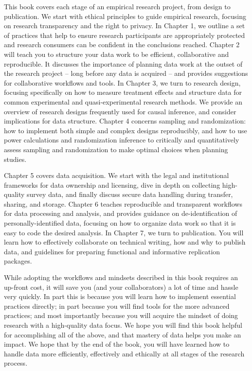 This book covers each stage of an empirical research project, from design to publication.
We start with ethical principles to guide empirical research,
focusing on research transparency and the right to privacy.
In Chapter 1, we outline a set of practices that help to ensure
research participants are appropriately protected and
research consumers can be confident in the conclusions reached.
Chapter 2 will teach you to structure your data work to be efficient,
collaborative and reproducible.
It discusses the importance of planning data work at the outset of the research project --
long before any data is acquired -- and provides suggestions for collaborative workflows and tools.
In Chapter 3, we turn to research design,
focusing specifically on how to measure treatment effects
and structure data for common experimental and quasi-experimental research methods.
We provide an overview of research designs frequently used for
causal inference, and consider implications for data structure.
Chapter 4 concerns sampling and randomization:
how to implement both simple and complex designs reproducibly,
and how to use power calculations and randomization inference
to critically and quantitatively assess
sampling and randomization to make optimal choices when planning studies.

Chapter 5 covers data acquisition. We start with
the legal and institutional frameworks for data ownership and licensing,
dive in depth on collecting high-quality survey data,
and finally discuss secure data handling during transfer, sharing, and storage.
Chapter 6 teaches reproducible and transparent workflows for data processing and analysis,
and provides guidance on de-identification of personally-identified data,
focusing on how to organize data work so that it is easy to code the desired analysis.
In Chapter 7, we turn to publication. You will learn
how to effectively collaborate on technical writing,
how and why to publish data,
and guidelines for preparing functional and informative replication packages.


While adopting the workflows and mindsets described in this book requires an up-front cost,
it will save you (and your collaborators) a lot of time and hassle very quickly.
In part this is because you will learn how to implement essential practices directly;
in part because you will find tools for the more advanced practices;
and most importantly because you will acquire the mindset of doing research with a high-quality data focus.
We hope you will find this book helpful for accomplishing all of the above,
and that mastery of data helps you make an impact.
We hope that by the end of the book,
you will have learned how to handle data more efficiently, effectively and ethically
at all stages of the research process.

\mainmatter
